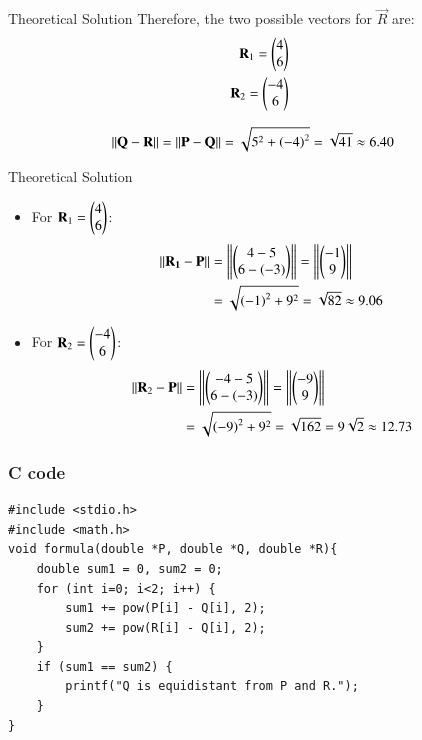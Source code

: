 \documentclass{beamer}
\begin{document}
\begin{frame}{Theoretical Solution}
Therefore, the two possible vectors for $\vec{R}$ are:
\begin{align}
\mathbf{R}_1 = \begin{pmatrix}4 \\ 6\end{pmatrix}  \\  \mathbf{R}_2 = \begin{pmatrix}-4 \\ 6\end{pmatrix}
\end{align}




\begin{align}
     \left\lVert\mathbf{Q} - \mathbf{R}\right\rVert&= \left\lVert\mathbf{P} - \mathbf{Q}\right\rVert = \sqrt{5^2 + \left(-4\right)^2} = \sqrt{41} \approx 6.40
\end{align}
\end{frame}



\begin{frame}{Theoretical Solution}
\begin{itemize}
    \item For $\mathbf{R}_1 = \begin{pmatrix}4 \\ 6\end{pmatrix}$:
    \begin{align}
     \left\lVert\mathbf{R_1} - \mathbf{P}\right\rVert &= \left\lVert \begin{pmatrix}4 - 5 \\ 6 - \left(-3\right)\end{pmatrix}\right\rVert  = \left\lVert \begin{pmatrix}-1 \\ 9\end{pmatrix}\right\rVert \\
    &= \sqrt{\left(-1\right)^2 + 9^2} = \sqrt{82} \approx 9.06
    \end{align}
    \item For $\mathbf{R}_2 = \begin{pmatrix}-4 \\ 6\end{pmatrix}$:
    \begin{align}
    \left\lVert\mathbf{R}_2 - \mathbf{P}\right\rVert &= \left\lVert\begin{pmatrix}-4 - 5 \\ 6 - (-3)\end{pmatrix}\right\rVert  = \left\lVert\begin{pmatrix}-9 \\ 9\end{pmatrix}\right\rVert \\
    &= \sqrt{\left(-9\right)^2 + 9^2} = \sqrt{162} = 9\sqrt{2} \approx 12.73
    \end{align}
\end{itemize}
\end{frame}

\begin{frame}[fragile]
    \frametitle{C code}
    \begin{lstlisting}
#include <stdio.h>
#include <math.h>
void formula(double *P, double *Q, double *R){
    double sum1 = 0, sum2 = 0;
    for (int i=0; i<2; i++) {
        sum1 += pow(P[i] - Q[i], 2);
        sum2 += pow(R[i] - Q[i], 2);
    }
    if (sum1 == sum2) {
        printf("Q is equidistant from P and R.");
    }
}
    \end{lstlisting}
\end{frame}
\end{document}
